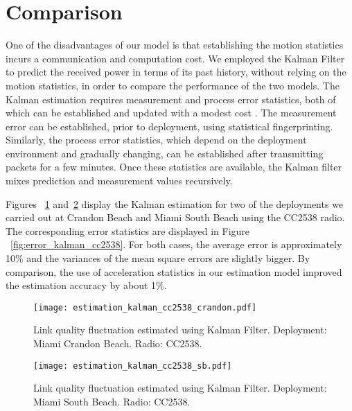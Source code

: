 \section{Comparison}
\label{sec:comp}

One of the disadvantages of our model is that establishing the motion statistics incurs a communication and computation cost. We employed the Kalman Filter to predict the received power in terms of its past history, without relying on the motion statistics, in order to compare the performance of the two models. The Kalman estimation requires measurement and process error statistics, both of which can be established and updated with a modest cost \cite{elsisi2023robust}. The measurement error can be established, prior to deployment, using statistical fingerprinting. Similarly, the process error statistics, which depend on the deployment environment and gradually changing, can be established after transmitting packets for a few minutes. Once these statistics are available, the Kalman filter mixes prediction and measurement values recursively.

Figures ~\ref{fig:estimation_kalman_cc2538_crandon} and~\ref{fig:estimation_kalman_cc2538_sb} display the Kalman estimation for two of the deployments we carried out at Crandon Beach and Miami South Beach using the CC2538 radio. The corresponding error statistics are displayed in Figure ~\ref{fig:error_kalman_cc2538}. For both cases, the average error is approximately 10\% and the variances of the mean square errors are slightly bigger. By comparison, the use of acceleration statistics in our estimation model improved the estimation accuracy by about 1\%. 

\begin{figure}
	\centering
		\texttt{[image: estimation\_kalman\_cc2538\_crandon.pdf]}
	\caption{Link quality fluctuation estimated using Kalman Filter. Deployment: Miami Crandon Beach. Radio: CC2538.}
	\label{fig:estimation_kalman_cc2538_crandon}
\end{figure}


\begin{figure}
	\centering
		\texttt{[image: estimation\_kalman\_cc2538\_sb.pdf]}
	\caption{Link quality fluctuation estimated using Kalman Filter. Deployment: Miami South Beach. Radio: CC2538.}
	\label{fig:estimation_kalman_cc2538_sb}
\end{figure}

